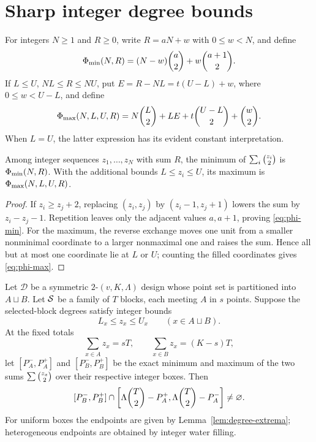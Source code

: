 \section{Sharp integer degree bounds}\label{sec:integer-envelopes}

For integers \(N\ge1\) and \(R\ge0\), write \(R=aN+w\) with
\(0\le w<N\), and define
\begin{equation}\label{eq:phi-min}
 \Phi_{\min}(N,R)=(N-w)\binom{a}{2}+w\binom{a+1}{2}.
\end{equation}
If \(L\le U\), \(NL\le R\le NU\), put
\(E=R-NL=t(U-L)+w\), where \(0\le w<U-L\), and define
\begin{equation}\label{eq:phi-max}
 \Phi_{\max}(N,L,U,R)
 =N\binom{L}{2}+LE+t\binom{U-L}{2}+\binom{w}{2}.
\end{equation}
When \(L=U\), the latter expression has its evident constant interpretation.

\begin{lemma}\label{lem:degree-extrema}
Among integer sequences \(z_1,\dots,z_N\) with sum \(R\), the minimum of
\(\sum_i\binom{z_i}{2}\) is \(\Phi_{\min}(N,R)\).  With the additional bounds
\(L\le z_i\le U\), its maximum is \(\Phi_{\max}(N,L,U,R)\).
\end{lemma}

\begin{proof}
If \(z_i\ge z_j+2\), replacing \((z_i,z_j)\) by
\((z_i-1,z_j+1)\) lowers the sum by \(z_i-z_j-1\).  Repetition leaves only
the adjacent values \(a,a+1\), proving \eqref{eq:phi-min}.  For the maximum,
the reverse exchange moves one unit from a smaller nonminimal coordinate to a
larger nonmaximal one and raises the sum.  Hence all but at most one coordinate
lie at \(L\) or \(U\); counting the filled coordinates gives
\eqref{eq:phi-max}.
\end{proof}

\begin{theorem}\label{thm:paired-envelope}
Let \(\mathcal D\) be a symmetric \(2\)-\((v,K,\Lambda)\) design whose point
set is partitioned into \(A\sqcup B\).  Let \(\mathcal S\) be a family of \(T\)
blocks, each meeting \(A\) in \(s\) points.  Suppose the selected-block
degrees satisfy integer bounds
\[
 L_x\le z_x\le U_x\qquad(x\in A\sqcup B).
\]
At the fixed totals
\[
 \sum_{x\in A}z_x=sT,
 \qquad
 \sum_{x\in B}z_x=(K-s)T,
\]
let \([P_A^-,P_A^+]\) and \([P_B^-,P_B^+]\) be the exact minimum and maximum
of the two sums \(\sum\binom{z_x}{2}\) over their respective integer boxes.
Then
\begin{equation}\label{eq:interval-overlap}
 [P_B^-,P_B^+]
 \cap
 \left[\Lambda\binom{T}{2}-P_A^+,
       \Lambda\binom{T}{2}-P_A^-\right]\ne\varnothing.
\end{equation}
For uniform boxes the endpoints are given by
Lemma~\ref{lem:degree-extrema}; heterogeneous endpoints are obtained by
integer water filling.
\end{theorem}

